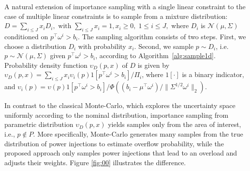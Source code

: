 A natural extension of importance sampling with a single linear constraint to the case of multiple linear constraints is to sample from a mixture distribution: 
    $D = \sum_{i \le J} x_i D_i, \text{ with } \sum_{i\le J} x_i = 1, x_i \ge 0, \; 1\le i \le J,$
where $D_i$ is $\mathcal{N}(\mu,\Sigma)$ conditioned on $p^\top\omega^i > \!b_i$. 
%
The sampling algorithm consists of two steps. First, we choose a distribution $D_i$ with probability $x_i$. Second, we sample $p \sim D_i$, i.e. $p\sim \mathcal{N}(\mu,\Sigma)$ given $p^\top\omega^i>b_i$, according to Algorithm~\ref{alg:sample1d}.
%
Probability density function $\upsilon_D(p, x)$ of $D$ is given by
    $\upsilon_D(p, x) = \sum\limits_{i\le J} x_i \upsilon_i(p) 1[p^\top \omega^i > b_i]/\Pi_i$,
where $1[\cdot]$ is a binary indicator, and 
$%
    \upsilon_i(p) = \upsilon(p) 1[p^\top\omega^i > b_i]/\Phi((b_i - \mu^\top\omega^i)/\|\Sigma^{1/2}\omega^i\|_2).
$%

In contrast to the classical Monte-Carlo, which explores the uncertainty space uniformly according to the nominal distribution, importance sampling from parametric distribution $\upsilon_D(p,x)$ yields samples only from the area of interest, i.e., $p\not\in P$. 
More specifically, Monte-Carlo generates many samples from the true distribution of power injections to estimate overflow probability, while the proposed approach only samples power injections that lead to an overload and adjusts their weights.
Figure \ref{fig:00} illustrates the difference. 

